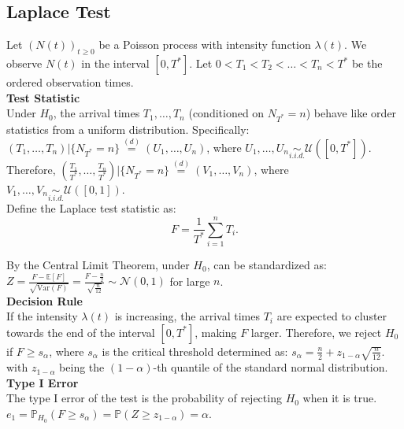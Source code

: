\documentclass{journalstyle}
\begin{document}
\subsection{Laplace Test}

Let $(N(t))_{t \geq 0}$ be a Poisson process with intensity function $\lambda(t)$.
We observe $N(t)$ in the interval $[0, T^*]$.
Let $0 < T_1 < T_2 < \ldots < T_n < T^*$ be the ordered observation times. \\

\noindent\textbf{Test Statistic} \\
Under $H_0$, the arrival times $T_1, \ldots, T_n$ (conditioned on $N_{T^*} = n$) behave like order statistics from a uniform distribution.
Specifically: \\
$(T_1, \ldots, T_n) | \{N_{T^*} = n\} \overset{(d)}{=} (U_1, \ldots, U_n)$, where $U_1, \ldots, U_n \underset{i.i.d.}{\sim} \mathcal{U}([0, T^*])$. \\
Therefore, $(\frac{T_1}{T^*}, \ldots, \frac{T_n}{T^*}) | \{N_{T^*} = n\} \overset{(d)}{=} (V_1, \ldots, V_n)$, where $V_1, \ldots, V_n \underset{i.i.d.}{\sim} \mathcal{U}([0, 1])$. \\
Define the Laplace test statistic as: 
\begin{equation}
    F = \frac{1}{T^*} \sum_{i=1}^n T_i.
    \label{eq:laplace_test_statistic}
\end{equation}

By the Central Limit Theorem, under $H_0$,  can be standardized as: 
$Z = \frac{F - \mathbb{E}[F]}{\sqrt{\text{Var}(F)}} = \frac{F - \frac{n}{2}}{\sqrt{\frac{n}{12}}} \sim \mathcal{N}(0, 1)$
for large $n$. \\

\noindent\textbf{Decision Rule} \\
If the intensity $\lambda(t)$ is increasing, the arrival times $T_i$ are expected to cluster towards the end of the interval $[0, T^*]$, making $F$ larger.
Therefore, we reject $H_0$ if $F \geq s_{\alpha}$, where $s_{\alpha}$ is the critical threshold determined as: $s_{\alpha} = \frac{n}{2} + z_{1 - \alpha} \sqrt{\frac{n}{12}}$. \\
with $z_{1 - \alpha}$ being the $(1 - \alpha)$-th quantile of the standard normal distribution. \\

\noindent\textbf{Type I Error} \\
The type I error of the test is the probability of rejecting $H_0$ when it is true. \\
$e_1 = \mathbb{P}_{H_0}(F \geq s_{\alpha}) = \mathbb{P}(Z \geq z_{1 - \alpha}) = \alpha$. \\
\end{document}
